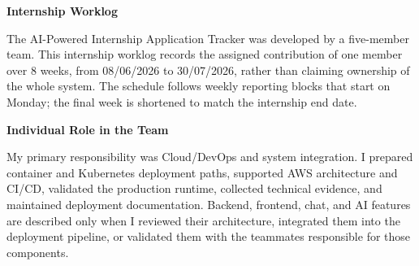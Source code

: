 \vspace{0.5em}\noindent\textbf{Internship Worklog}\par

The AI-Powered Internship Application Tracker was developed by a
five-member team. This internship worklog records the assigned
contribution of one member over 8 weeks, from 08/06/2026 to 30/07/2026,
rather than claiming ownership of the whole system. The schedule follows
weekly reporting blocks that start on Monday; the final week is
shortened to match the internship end date.

\vspace{0.5em}\noindent\textbf{Individual Role in the
Team}\par

My primary responsibility was Cloud/DevOps and system integration. I
prepared container and Kubernetes deployment paths, supported AWS
architecture and CI/CD, validated the production runtime, collected
technical evidence, and maintained deployment documentation. Backend,
frontend, chat, and AI features are described only when I reviewed their
architecture, integrated them into the deployment pipeline, or validated
them with the teammates responsible for those components.

